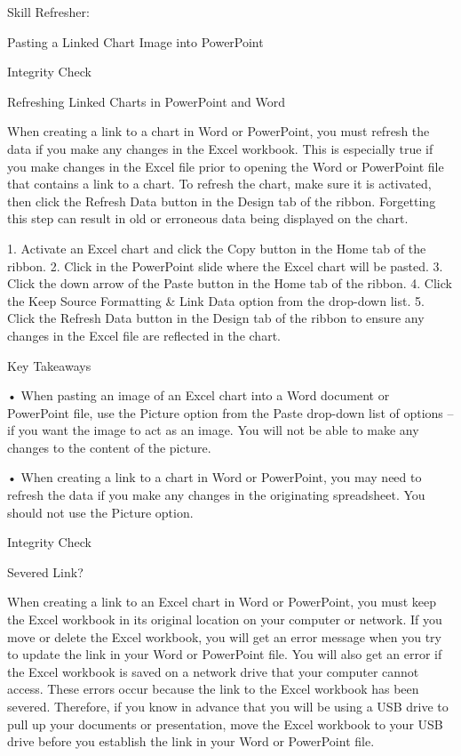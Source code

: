 Skill Refresher:


Pasting a Linked Chart Image into PowerPoint




Integrity Check

Refreshing Linked Charts in PowerPoint and Word

When creating a link to a chart in Word or PowerPoint, you must refresh the data if you make any changes in
the Excel workbook. This is especially true if you make changes in the Excel file prior to opening the Word or
PowerPoint file that contains a link to a chart. To refresh the chart, make sure it is activated, then click the Refresh
Data button in the Design tab of the ribbon. Forgetting this step can result in old or erroneous data being displayed
on the chart.





1. Activate an Excel chart and click the Copy button in the Home tab of the ribbon.
2. Click in the PowerPoint slide where the Excel chart will be pasted.
3. Click the down arrow of the Paste button in the Home tab of the ribbon.
4. Click the Keep Source Formatting \& Link Data option from the drop-down list.
5. Click the Refresh Data button in the Design tab of the ribbon to ensure any changes in the Excel file are
reflected in the chart.




Key Takeaways


• When pasting an image of an Excel chart into a Word document or PowerPoint file, use the Picture option
from the Paste drop-down list of options – if you want the image to act as an image. You will not be able to
make any changes to the content of the picture.

• When creating a link to a chart in Word or PowerPoint, you may need to refresh the data if you make any
changes in the originating spreadsheet. You should not use the Picture option.




Integrity Check

Severed Link?

When creating a link to an Excel chart in Word or PowerPoint, you must keep the Excel workbook in its original
location on your computer or network. If you move or delete the Excel workbook, you will get an error message
when you try to update the link in your Word or PowerPoint file. You will also get an error if the Excel workbook
is saved on a network drive that your computer cannot access. These errors occur because the link to the Excel
workbook has been severed. Therefore, if you know in advance that you will be using a USB drive to pull up your
documents or presentation, move the Excel workbook to your USB drive before you establish the link in your Word
or PowerPoint file.





